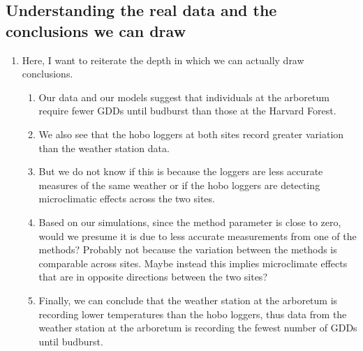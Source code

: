 \documentclass{article}\usepackage[]{graphicx}\usepackage[]{color}
\begin{document}
\subsection*{Understanding the real data and the conclusions we can draw}
\begin{enumerate}
\item Here, I want to reiterate the depth in which we can actually draw conclusions.
  \begin{enumerate}
  \item Our data and our models suggest that individuals at the arboretum require fewer GDDs until budburst than those at the Harvard Forest.
  \item We also see that the hobo loggers at both sites record greater variation than the weather station data.
  \item But we do not know if this is because the loggers are less accurate measures of the same weather or if the hobo loggers are detecting microclimatic effects across the two sites. 
  \item Based on our simulations, since the method parameter is close to zero, would we presume it is due to less accurate measurements from one of the methods? Probably not because the variation between the methods is comparable across sites. Maybe instead this implies microclimate effects that are in opposite directions between the two sites?
  \item Finally, we can conclude that the weather station at the arboretum is recording lower temperatures than the hobo loggers, thus data from the weather station at the arboretum is recording the fewest number of GDDs until budburst. %
  \end{enumerate}
\end{enumerate}
\end{document}

